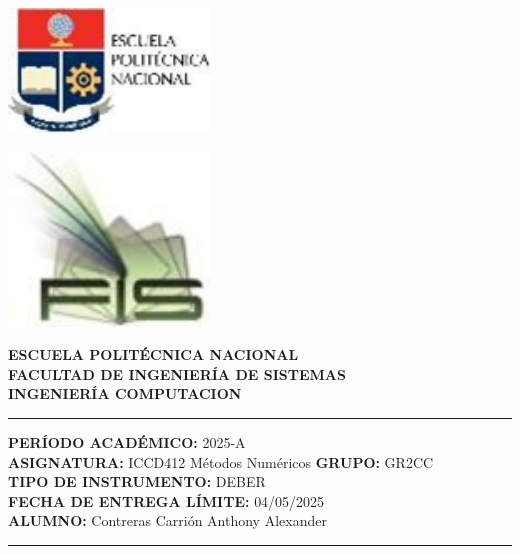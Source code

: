 \documentclass[12pt]{article}
\begin{document}
\begin{minipage}{0.45\textwidth}
    \includegraphics[width=0.4\textwidth]{inFiles/Figures/epnLogo.jpg}
\end{minipage}
\hfill
\begin{minipage}{0.45\textwidth}
    \raggedleft
    \includegraphics[width=0.4\textwidth]{inFiles/Figures/FIS_logo.jpg}
\end{minipage}

\vspace{0.5cm}

\begin{center}
    \textbf{ESCUELA POLITÉCNICA NACIONAL}\\[0.2cm]
    \textbf{FACULTAD DE INGENIERÍA DE SISTEMAS}\\[0.2cm]
    \textbf{INGENIERÍA COMPUTACION}
\end{center}

\vspace{0.5cm}
\hrule
\vspace{0.5cm}

\noindent\textbf{PERÍODO ACADÉMICO:} 2025-A\\[0.2cm]
\noindent\textbf{ASIGNATURA:} ICCD412 Métodos Numéricos \hfill \textbf{GRUPO:} GR2CC\\[0.2cm]
\noindent\textbf{TIPO DE INSTRUMENTO:} DEBER\\[0.2cm]
\noindent\textbf{FECHA DE ENTREGA LÍMITE:} {04/05/2025}\\[0.2cm]
\noindent\textbf{ALUMNO:} Contreras Carrión Anthony Alexander

\vspace{0.5cm}
\hrule
\vspace{1cm}
\end{document}
